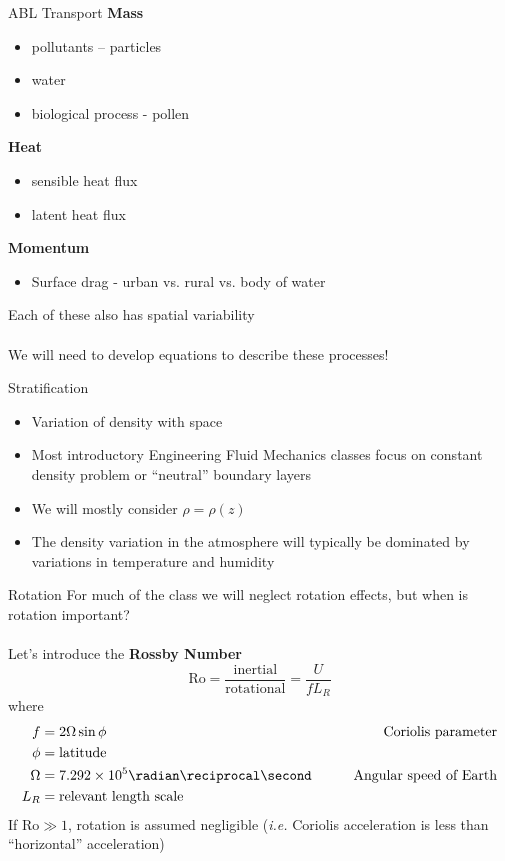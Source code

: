 \begin{frame}{ABL Transport}
\textbf{Mass}
\begin{itemize}
	\item pollutants – particles
	\item water
	\item biological process - pollen
\end{itemize}

\textbf{Heat}
\begin{itemize}
	\item sensible heat flux
	\item latent heat flux
\end{itemize}

\textbf{Momentum}
\begin{itemize}
	\item Surface drag - urban vs. rural vs. body of water
\end{itemize}
Each of these also has spatial variability
~\\~\\
We will need to develop equations to describe these processes!
\end{frame}

\begin{frame}{Stratification}

\begin{itemize}
	\item Variation of density with space
	\item Most introductory Engineering Fluid Mechanics classes focus on constant density problem or ``neutral'' boundary layers
	\item We will mostly consider $\rho = \rho(z)$
	\item The density variation in the atmosphere will typically be dominated by variations in temperature and humidity
\end{itemize}

\end{frame}

\begin{frame}{Rotation}
For much of the class we will neglect rotation effects, but when is rotation important?
~\\~\\
Let's introduce the \textbf{Rossby Number}
$$
\mathrm{Ro} = \frac{\text{inertial}}{\text{rotational}} = \frac{U}{fL_R}
$$
where
\begin{align*}
	f& = 2\Omega \sin\phi\qquad &\text{Coriolis parameter}&\\
	\phi &= \text{latitude}\\
	\Omega &= 7.292 \times 10^5 \radian\reciprocal\second \qquad &\text{Angular speed of Earth}&\\
	L_R &= \text{relevant length scale}
\end{align*}
If $\mathrm{Ro} \gg 1$, rotation is assumed negligible (\textit{i.e.} Coriolis acceleration is less than ``horizontal'' acceleration)
\end{frame}

